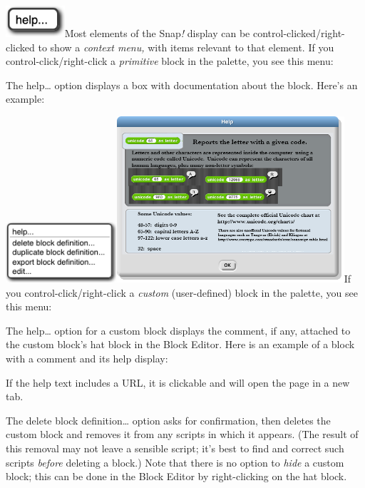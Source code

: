 \includegraphics[width=0.86111in,height=0.45903in]{media/image1051.png}Most
elements of the Snap\emph{!} display can be
control-clicked/right-clicked to show a \emph{context menu,} with items
relevant to that element. If you control-click/right-click a
\emph{primitive} block in the palette, you see this menu:

The help\ldots{} option displays a box with documentation about the
block. Here's an example:

\includegraphics[width=1.62292in,height=0.88889in]{media/image1052.png}\includegraphics[width=3.32222in,height=2.42778in]{media/image1053.png}If
you control-click/right-click a \emph{custom} (user-defined) block in
the palette, you see this menu:

The help\ldots{} option for a custom block displays the comment, if any,
attached to the custom block's hat block in the Block Editor. Here is an
example of a block with a comment and its help display:

If the help text includes a URL, it is clickable and will open the page
in a new tab.

The delete block definition\ldots{} option asks for confirmation, then
deletes the custom block and removes it from any scripts in which it
appears. (The result of this removal may not leave a sensible script;
it's best to find and correct such scripts \emph{before} deleting a
block.) Note that there is no option to \emph{hide} a custom block; this
can be done in the Block Editor by right-clicking on the hat block.

